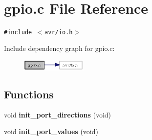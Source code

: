 \section{gpio.c File Reference}
\label{gpio_8c}
{\tt \#include $<$avr/io.h$>$}\par


Include dependency graph for gpio.c:\begin{figure}[H]
\begin{center}
\leavevmode
\includegraphics[width=92pt]{gpio_8c__incl}
\end{center}
\end{figure}
\subsection*{Functions}
\begin{CompactItemize}
\item 
void {\bf init\_\-port\_\-directions} (void)
\item 
void {\bf init\_\-port\_\-values} (void)
\end{CompactItemize}
